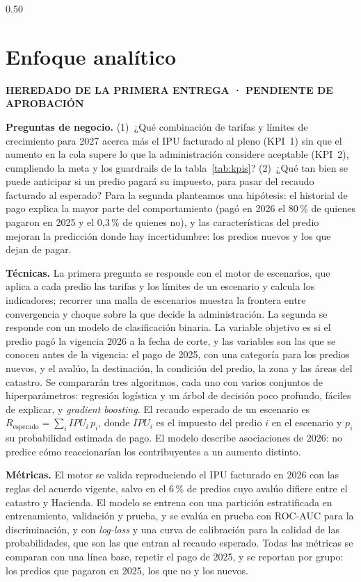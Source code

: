 \documentclass[12pt,letterpaper]{article}
\newcommand{\heredado}{\par\noindent\colorbox{amarillo}{\footnotesize\bfseries
  HEREDADO DE LA PRIMERA ENTREGA · PENDIENTE DE APROBACIÓN}\par\smallskip}
\begin{document}
\begin{espacio}{0.50}
\section{Enfoque analítico} %
\heredado
\textbf{Preguntas de negocio.} (1)~¿Qué combinación de tarifas y límites de crecimiento para
2027 acerca más el IPU facturado al pleno (KPI~1) sin que el aumento en la cola supere lo que la
administración considere aceptable (KPI~2), cumpliendo la meta y los guardrails de la
tabla~\ref{tab:kpis}? (2)~¿Qué tan bien se puede anticipar si un predio pagará su impuesto, para
pasar del recaudo facturado al esperado? Para la segunda planteamos una hipótesis: el historial
de pago explica la mayor parte del comportamiento (pagó en 2026 el 80\,\% de quienes pagaron en
2025 y el 0,3\,\% de quienes no), y las características del predio mejoran la predicción donde
hay incertidumbre: los predios nuevos y los que dejan de pagar.

\textbf{Técnicas.} La primera pregunta se responde con el motor de escenarios, que aplica a cada
predio las tarifas y los límites de un escenario y calcula los indicadores; recorrer una malla de
escenarios muestra la frontera entre convergencia y choque sobre la que decide la administración.
La segunda se responde con
un modelo de clasificación binaria. La variable objetivo es si el predio pagó la vigencia 2026 a
la fecha de corte, y las variables son las que se conocen antes de la vigencia: el pago de 2025,
con una categoría para los predios nuevos, y el avalúo, la destinación, la condición del predio,
la zona y las áreas del catastro. Se compararán tres algoritmos, cada uno con varios conjuntos de
hiperparámetros: regresión logística y un árbol de decisión poco profundo, fáciles de explicar, y
\textit{gradient boosting}. El recaudo esperado de un escenario es
$R_{\text{esperado}}=\sum_{i} \mathit{IPU}_i\,p_i$, donde $\mathit{IPU}_i$ es el impuesto del
predio $i$ en el escenario y $p_i$ su probabilidad estimada de pago. El modelo describe asociaciones de 2026: no predice cómo reaccionarían los
contribuyentes a un aumento distinto.

\textbf{Métricas.} El motor se valida reproduciendo el IPU facturado en 2026 con las reglas del
acuerdo vigente, salvo en el 6\,\% de predios cuyo avalúo difiere entre el catastro y Hacienda.
El modelo se entrena con una partición estratificada en entrenamiento, validación y prueba, y se
evalúa en prueba con ROC-AUC para la discriminación, y con \textit{log-loss} y una curva de
calibración para la calidad de las probabilidades, que son las que entran al recaudo esperado.
Todas las métricas se comparan con una línea base, repetir el pago de 2025, y se reportan por
grupo: los predios que pagaron en 2025, los que no y los nuevos.

\end{espacio}
\end{document}
